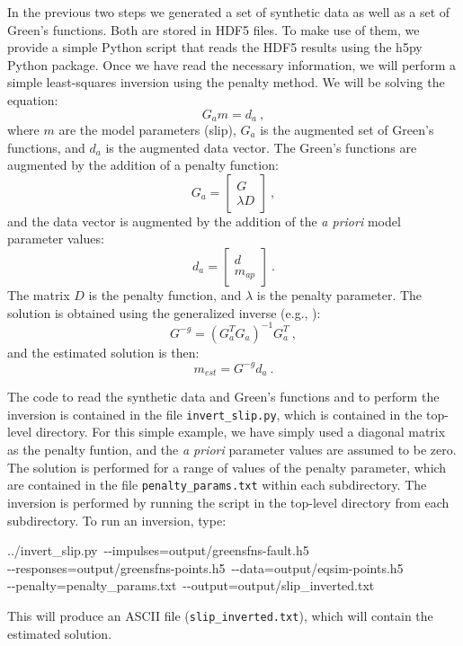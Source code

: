 In the previous two steps we generated a set of synthetic data as
well as a set of Green's functions. Both are stored in HDF5 files.
To make use of them, we provide a simple Python script that reads
the HDF5 results using the h5py Python package. Once we have read
the necessary information, we will perform a simple least-squares
inversion using the penalty method. We will be solving the equation:
\begin{equation}
G_{a}m=d_{a}\:,
\end{equation}
where $m$ are the model parameters (slip), $G_{a}$ is the augmented
set of Green's functions, and $d_{a}$ is the augmented data vector.
The Green's functions are augmented by the addition of a penalty function:
\begin{equation}
G_{a}=\left[\begin{array}{c}
G\\
\lambda D
\end{array}\right]\:,
\end{equation}
and the data vector is augmented by the addition of the \textit{a
priori} model parameter values:
\begin{equation}
d_{a}=\left[\begin{array}{c}
d\\
m_{ap}
\end{array}\right]\:.
\end{equation}
The matrix $D$ is the penalty function, and $\lambda$ is the penalty
parameter. The solution is obtained using the generalized inverse
(e.g., \cite{Menke:1984}):
\begin{equation}
G^{-g}=\left(G_{a}^{T}G_{a}\right)^{-1}G_{a}^{T}\:,
\end{equation}
and the estimated solution is then:
\begin{equation}
m_{est}=G^{-g}d_{a}\:.
\end{equation}


The code to read the synthetic data and Green's functions and to perform
the inversion is contained in the file \texttt{invert\_slip.py}, which
is contained in the top-level directory. For this simple example,
we have simply used a diagonal matrix as the penalty funtion, and
the \textit{a priori} parameter values are assumed to be zero. The
solution is performed for a range of values of the penalty parameter,
which are contained in the file \texttt{penalty\_params.txt} within
each subdirectory. The inversion is performed by running the script
in the top-level directory from each subdirectory. To run an inversion,
type:
\begin{lyxcode}
../invert\_slip.py~-{}-impulses=output/greensfns-fault.h5~\\
-{}-responses=output/greensfns-points.h5~-{}-data=output/eqsim-points.h5~\\
-{}-penalty=penalty\_params.txt~-{}-output=output/slip\_inverted.txt
\end{lyxcode}
This will produce an ASCII file (\texttt{slip\_inverted.txt}), which
will contain the estimated solution.


